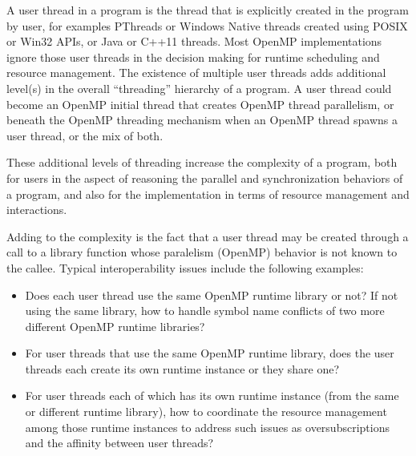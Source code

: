 A user thread in a program is the thread that is explicitly created in the program by user, for examples PThreads or Windows Native threads created 
using POSIX or Win32 APIs, or Java or C++11 threads. 
Most OpenMP implementations ignore those user threads in the decision making for runtime scheduling and resource management. 
The existence of multiple user threads adds additional level(s) in the overall ``threading''
hierarchy of a program. %
A user thread could become an OpenMP initial thread that creates OpenMP thread
parallelism, or beneath the OpenMP threading mechanism when an OpenMP thread spawns 
a user thread, or the mix of both. 

These additional levels of threading increase the complexity of a program, both for 
users in the aspect of reasoning the parallel and synchronization behaviors of a program, 
and also for the implementation in terms of resource management and 
interactions. 

Adding to the complexity is the fact that a user thread may be created 
through a call to a library function whose paralelism (OpenMP) behavior is not known to 
the callee. Typical interoperability issues include the following examples: 
\begin{itemize}
\item Does each user thread use the same OpenMP runtime library or not? 
	If not using the same library, how to handle symbol name 
	conflicts of two more different OpenMP runtime libraries? 
\item For user threads that use the same OpenMP runtime library, does the user threads each create its own runtime instance or they share one?
\item For user threads each of which has its own runtime instance (from the same or 
	different runtime library), how to coordinate the resource management among those
	runtime instances to address such issues as oversubscriptions and the affinity
	between user threads?
\end{itemize}

